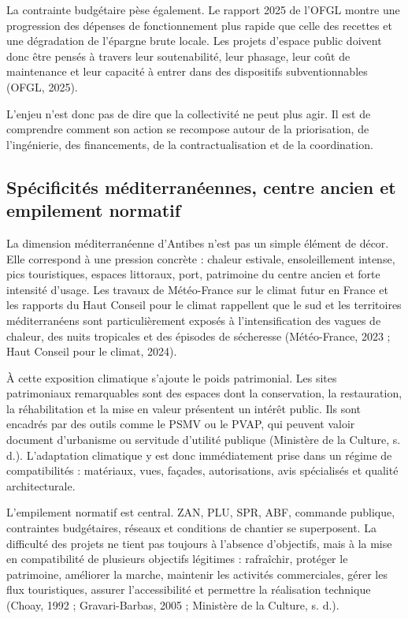\documentclass[11pt,a4paper]{report}
\begin{document}
La contrainte budgétaire pèse également. Le rapport 2025 de l'OFGL montre une progression des dépenses de fonctionnement plus rapide que celle des recettes et une dégradation de l'épargne brute locale. Les projets d'espace public doivent donc être pensés à travers leur soutenabilité, leur phasage, leur coût de maintenance et leur capacité à entrer dans des dispositifs subventionnables (OFGL, 2025).

L'enjeu n'est donc pas de dire que la collectivité ne peut plus agir. Il est de comprendre comment son action se recompose autour de la priorisation, de l'ingénierie, des financements, de la contractualisation et de la coordination.

\subsection{Spécificités méditerranéennes, centre ancien et empilement normatif}

La dimension méditerranéenne d'Antibes n'est pas un simple élément de décor. Elle correspond à une pression concrète : chaleur estivale, ensoleillement intense, pics touristiques, espaces littoraux, port, patrimoine du centre ancien et forte intensité d'usage. Les travaux de Météo-France sur le climat futur en France et les rapports du Haut Conseil pour le climat rappellent que le sud et les territoires méditerranéens sont particulièrement exposés à l'intensification des vagues de chaleur, des nuits tropicales et des épisodes de sécheresse (Météo-France, 2023 ; Haut Conseil pour le climat, 2024).

À cette exposition climatique s'ajoute le poids patrimonial. Les sites patrimoniaux remarquables sont des espaces dont la conservation, la restauration, la réhabilitation et la mise en valeur présentent un intérêt public. Ils sont encadrés par des outils comme le PSMV ou le PVAP, qui peuvent valoir document d'urbanisme ou servitude d'utilité publique (Ministère de la Culture, s. d.). L'adaptation climatique y est donc immédiatement prise dans un régime de compatibilités : matériaux, vues, façades, autorisations, avis spécialisés et qualité architecturale.

L'empilement normatif est central. ZAN, PLU, SPR, ABF, commande publique, contraintes budgétaires, réseaux et conditions de chantier se superposent. La difficulté des projets ne tient pas toujours à l'absence d'objectifs, mais à la mise en compatibilité de plusieurs objectifs légitimes : rafraîchir, protéger le patrimoine, améliorer la marche, maintenir les activités commerciales, gérer les flux touristiques, assurer l'accessibilité et permettre la réalisation technique (Choay, 1992 ; Gravari-Barbas, 2005 ; Ministère de la Culture, s. d.).
\end{document}
